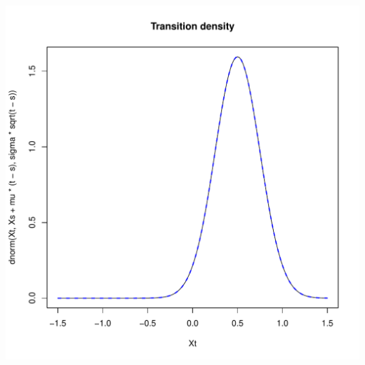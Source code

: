 \documentclass[a4paper,11pt]{article}\usepackage[]{graphicx}\usepackage[]{color}
\makeatletter
\def\maxwidth{ %
  \ifdim\Gin@nat@width>\linewidth
    \linewidth
  \else
    \Gin@nat@width
  \fi
}
\newenvironment{knitrout}{}{} %
\makeatother
\begin{document}
\begin{knitrout}
\includegraphics[width=\maxwidth]{figure/Test2-1} 

\end{knitrout}
\end{document}

